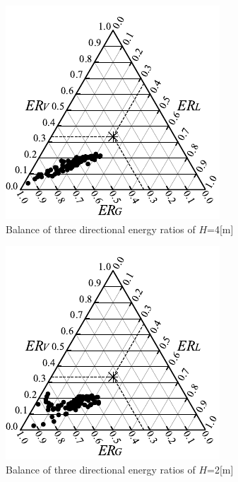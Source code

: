 \begin{figure}[htbp]
    \centering
    \includegraphics[keepaspectratio,scale=1.2]{05_att/rec_Ternary_out_4m.pdf}
    \caption{\hspace{1mm}Balance of three directional energy ratios of $H$=4[m]}
    \label{fig:sankaku4}
\end{figure}

\begin{figure}[htbp]
    \centering
    \includegraphics[keepaspectratio,scale=1.2]{05_att/rec_Ternary_out_2m.pdf}
    \caption{\hspace{1mm}Balance of three directional energy ratios of $H$=2[m]}
    \label{fig:sankaku2}
\end{figure}

